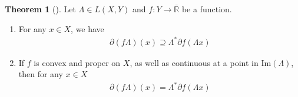 \documentclass[10pt, leqno]{amsart}
\theoremstyle{definition}
\newtheorem{theorem}{Theorem}[section]
\theoremstyle{remark}
\begin{document}
    \begin{theorem}[{\cite[p. 201]{IoffeTihomirov}}]
        Let \(\Lambda \in L(X, Y)\) and \(f\colon Y \to \overline{\mathbb{R}}\) be a function.
        \begin{enumerate}[label=(\roman*), wide]
            \item \label{compat_with_operator_theorem_1} For any \(x \in X\), we have
            \begin{align}
                \partial (f\Lambda)(x) \supseteq \Lambda^*\partial f(\Lambda x)
            \end{align}
            \item \label{compat_with_operator_theorem_2} If \(f\) is convex and proper on \(X\), as well as continuous at a point in \(\text{Im}(\Lambda)\), then for any \(x \in X\)
            \begin{align}
                \partial (f\Lambda)(x) = \Lambda^*\partial f(\Lambda x) \label{compat_with_operator_theorem_eq_2}
            \end{align}
        \end{enumerate}
    \end{theorem}

    \begin{figure}[!hbtp]
    \end{figure}
\end{document}
